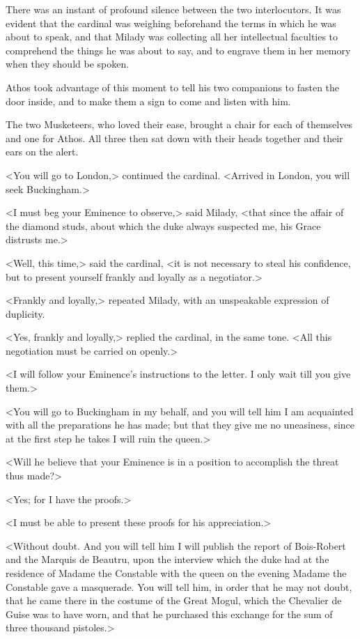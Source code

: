 There was an instant of profound silence between the two interlocutors. It was evident that the cardinal was weighing beforehand the terms in which he was about to speak, and that Milady was collecting all her intellectual faculties to comprehend the things he was about to say, and to engrave them in her memory when they should be spoken. 

Athos took advantage of this moment to tell his two companions to fasten the door inside, and to make them a sign to come and listen with him. 

The two Musketeers, who loved their ease, brought a chair for each of themselves and one for Athos. All three then sat down with their heads together and their ears on the alert. 

<You will go to London,> continued the cardinal. <Arrived in London, you will seek Buckingham.> 

<I must beg your Eminence to observe,> said Milady, <that since the affair of the diamond studs, about which the duke always suspected me, his Grace distrusts me.> 

<Well, this time,> said the cardinal, <it is not necessary to steal his confidence, but to present yourself frankly and loyally as a negotiator.> 

<Frankly and loyally,> repeated Milady, with an unspeakable expression of duplicity. 

<Yes, frankly and loyally,> replied the cardinal, in the same tone. <All this negotiation must be carried on openly.> 

<I will follow your Eminence's instructions to the letter. I only wait till you give them.> 

<You will go to Buckingham in my behalf, and you will tell him I am acquainted with all the preparations he has made; but that they give me no uneasiness, since at the first step he takes I will ruin the queen.> 

<Will he believe that your Eminence is in a position to accomplish the threat thus made?> 

<Yes; for I have the proofs.> 

<I must be able to present these proofs for his appreciation.> 

<Without doubt. And you will tell him I will publish the report of Bois-Robert and the Marquis de Beautru, upon the interview which the duke had at the residence of Madame the Constable with the queen on the evening Madame the Constable gave a masquerade. You will tell him, in order that he may not doubt, that he came there in the costume of the Great Mogul, which the Chevalier de Guise was to have worn, and that he purchased this exchange for the sum of three thousand pistoles.> 

